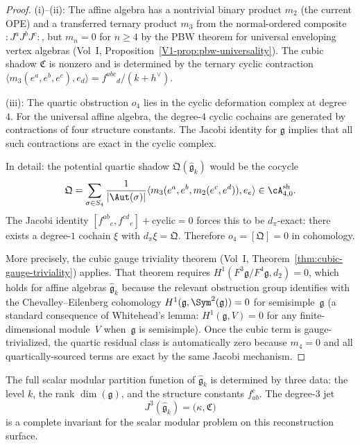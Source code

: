 \begin{proof}
(i)--(ii): The affine algebra has a nontrivial binary product $m_2$ (the current OPE)
and a transferred ternary product $m_3$ from the normal-ordered composite
$:J^a J^b J^c:$, but $m_n = 0$ for $n \geq 4$ by the PBW theorem for universal
enveloping vertex algebras (Vol~I, Proposition~\ref*{V1-prop:pbw-universality}). The
cubic shadow $\mathfrak{C}$ is nonzero and is determined by the ternary cyclic
contraction $\langle m_3(e^a, e^b, e^c), e_d \rangle = f^{abc}{}_d/(k + h^\vee)$.

(iii): The quartic obstruction $o_4$ lies in the cyclic deformation complex at
degree~$4$. For the universal affine algebra, the degree-$4$ cyclic cochains are
generated by contractions of four structure constants. The Jacobi identity for
$\mathfrak{g}$ implies that all such contractions are exact in the cyclic complex.

In detail: the potential quartic shadow $\mathfrak{Q}(\widehat{\mathfrak{g}}_k)$
would be the cocycle
\[
\mathfrak{Q} = \sum_{\sigma \in S_4}
\frac{1}{|\Aut(\sigma)|}
\langle m_3(e^a, e^b, m_2(e^c, e^d)), e_e \rangle
\in \cA^{\mathrm{sh}}_{4,0}.
\]
The Jacobi identity $[f^{ab}{}_e, f^{cd}{}_e] + \mathrm{cyclic} = 0$ forces this to
be $d_\pi$-exact: there exists a degree-$1$ cochain $\xi$ with
$d_\pi \xi = \mathfrak{Q}$. Therefore $o_4 = [\mathfrak{Q}] = 0$ in cohomology.

More precisely, the cubic gauge triviality theorem (Vol~I,
Theorem~\ref*{thm:cubic-gauge-triviality}) applies. That theorem requires
$H^1(F^3 \mathfrak{g}/F^4 \mathfrak{g}, d_2) = 0$, which holds for affine
algebras $\widehat{\mathfrak{g}}_k$ because the relevant obstruction group
identifies with the Chevalley--Eilenberg cohomology
$H^1(\mathfrak{g}, \Sym^2(\mathfrak{g})) = 0$ for semisimple~$\mathfrak{g}$
(a standard consequence of Whitehead's lemma: $H^1(\mathfrak{g}, V) = 0$
for any finite-dimensional module~$V$ when~$\mathfrak{g}$ is semisimple).
Once the cubic term is gauge-trivialized, the quartic
residual class is automatically zero because $m_4 = 0$ and all quartically-sourced
terms are exact by the same Jacobi mechanism.
\end{proof}

\begin{corollary}
The full scalar modular partition function of $\widehat{\mathfrak{g}}_k$ is determined by three
data: the level $k$, the rank $\dim(\mathfrak{g})$, and the structure constants
$f^c_{ab}$. The degree-$3$ jet
\[
J^3(\widehat{\mathfrak{g}}_k) = \bigl(\kappa, \mathfrak{C}\bigr)
\]
is a complete invariant for the scalar modular problem on this reconstruction surface.
\end{corollary}

